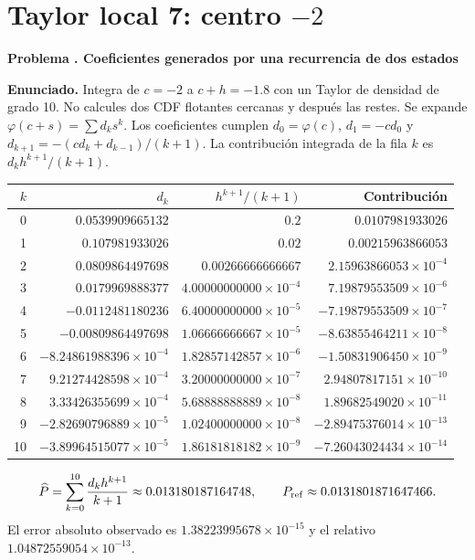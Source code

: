 \documentclass[11pt,a4paper]{article}
\theoremstyle{definition}
\newcounter{problema}
\newenvironment{resuelto}[1]{\refstepcounter{problema}\par\medskip\Needspace{6\baselineskip}\textbf{Problema \theproblema. #1}\par}{\par\medskip}
\begin{document}
\section{\texorpdfstring{Taylor local 7: centro $-2$}{Taylor local 7: centro -2}}
\begin{resuelto}{Coeficientes generados por una recurrencia de dos estados}
\textbf{Enunciado.} Integra de $c=-2$ a $c+h=-1.8$ con un Taylor de densidad de grado 10. No calcules dos CDF flotantes cercanas y después las restes.
Se expande $\varphi(c+s)=\sum d_ks^k$. Los coeficientes cumplen $d_0=\varphi(c)$, $d_1=-cd_0$ y $d_{k+1}=-(cd_k+d_{k-1})/(k+1)$. La contribución integrada de la fila $k$ es $d_kh^{k+1}/(k+1)$.

\begin{center}\small\begin{tabular}{rrrr}
\toprule
$k$&$d_k$&$h^{k+1}/(k+1)$&Contribución\\
\midrule
0&$0.0539909665132$&$0.2$&$0.0107981933026$\\
1&$0.107981933026$&$0.02$&$0.00215963866053$\\
2&$0.0809864497698$&$0.00266666666667$&$2.15963866053\times10^{-4}$\\
3&$0.0179969888377$&$4.00000000000\times10^{-4}$&$7.19879553509\times10^{-6}$\\
4&$-0.0112481180236$&$6.40000000000\times10^{-5}$&$-7.19879553509\times10^{-7}$\\
5&$-0.00809864497698$&$1.06666666667\times10^{-5}$&$-8.63855464211\times10^{-8}$\\
6&$-8.24861988396\times10^{-4}$&$1.82857142857\times10^{-6}$&$-1.50831906450\times10^{-9}$\\
7&$9.21274428598\times10^{-4}$&$3.20000000000\times10^{-7}$&$2.94807817151\times10^{-10}$\\
8&$3.33426355699\times10^{-4}$&$5.68888888889\times10^{-8}$&$1.89682549020\times10^{-11}$\\
9&$-2.82690796889\times10^{-5}$&$1.02400000000\times10^{-8}$&$-2.89475376014\times10^{-13}$\\
10&$-3.89964515077\times10^{-5}$&$1.86181818182\times10^{-9}$&$-7.26043024434\times10^{-14}$\\
\bottomrule\end{tabular}\end{center}
\[
\widehat P=\sum_{k=0}^{10}\frac{d_kh^{k+1}}{k+1}\approx0.013180187164748,\qquad P_{\rm ref}\approx0.0131801871647466.
\]
El error absoluto observado es $1.38223995678\times10^{-15}$ y el relativo $1.04872559054\times10^{-13}$.

\end{resuelto}
\end{document}
